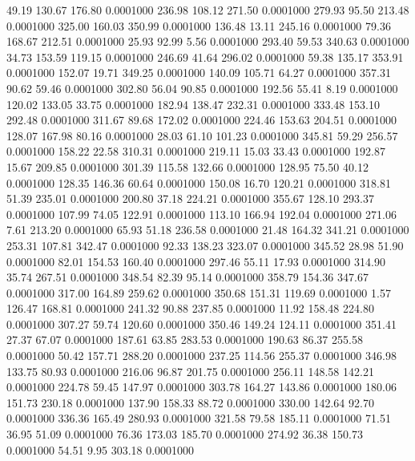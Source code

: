   49.19  130.67  176.80   0.0001000
 236.98  108.12  271.50   0.0001000
 279.93   95.50  213.48   0.0001000
 325.00  160.03  350.99   0.0001000
 136.48   13.11  245.16   0.0001000
  79.36  168.67  212.51   0.0001000
  25.93   92.99    5.56   0.0001000
 293.40   59.53  340.63   0.0001000
  34.73  153.59  119.15   0.0001000
 246.69   41.64  296.02   0.0001000
  59.38  135.17  353.91   0.0001000
 152.07   19.71  349.25   0.0001000
 140.09  105.71   64.27   0.0001000
 357.31   90.62   59.46   0.0001000
 302.80   56.04   90.85   0.0001000
 192.56   55.41    8.19   0.0001000
 120.02  133.05   33.75   0.0001000
 182.94  138.47  232.31   0.0001000
 333.48  153.10  292.48   0.0001000
 311.67   89.68  172.02   0.0001000
 224.46  153.63  204.51   0.0001000
 128.07  167.98   80.16   0.0001000
  28.03   61.10  101.23   0.0001000
 345.81   59.29  256.57   0.0001000
 158.22   22.58  310.31   0.0001000
 219.11   15.03   33.43   0.0001000
 192.87   15.67  209.85   0.0001000
 301.39  115.58  132.66   0.0001000
 128.95   75.50   40.12   0.0001000
 128.35  146.36   60.64   0.0001000
 150.08   16.70  120.21   0.0001000
 318.81   51.39  235.01   0.0001000
 200.80   37.18  224.21   0.0001000
 355.67  128.10  293.37   0.0001000
 107.99   74.05  122.91   0.0001000
 113.10  166.94  192.04   0.0001000
 271.06    7.61  213.20   0.0001000
  65.93   51.18  236.58   0.0001000
  21.48  164.32  341.21   0.0001000
 253.31  107.81  342.47   0.0001000
  92.33  138.23  323.07   0.0001000
 345.52   28.98   51.90   0.0001000
  82.01  154.53  160.40   0.0001000
 297.46   55.11   17.93   0.0001000
 314.90   35.74  267.51   0.0001000
 348.54   82.39   95.14   0.0001000
 358.79  154.36  347.67   0.0001000
 317.00  164.89  259.62   0.0001000
 350.68  151.31  119.69   0.0001000
   1.57  126.47  168.81   0.0001000
 241.32   90.88  237.85   0.0001000
  11.92  158.48  224.80   0.0001000
 307.27   59.74  120.60   0.0001000
 350.46  149.24  124.11   0.0001000
 351.41   27.37   67.07   0.0001000
 187.61   63.85  283.53   0.0001000
 190.63   86.37  255.58   0.0001000
  50.42  157.71  288.20   0.0001000
 237.25  114.56  255.37   0.0001000
 346.98  133.75   80.93   0.0001000
 216.06   96.87  201.75   0.0001000
 256.11  148.58  142.21   0.0001000
 224.78   59.45  147.97   0.0001000
 303.78  164.27  143.86   0.0001000
 180.06  151.73  230.18   0.0001000
 137.90  158.33   88.72   0.0001000
 330.00  142.64   92.70   0.0001000
 336.36  165.49  280.93   0.0001000
 321.58   79.58  185.11   0.0001000
  71.51   36.95   51.09   0.0001000
  76.36  173.03  185.70   0.0001000
 274.92   36.38  150.73   0.0001000
  54.51    9.95  303.18   0.0001000
